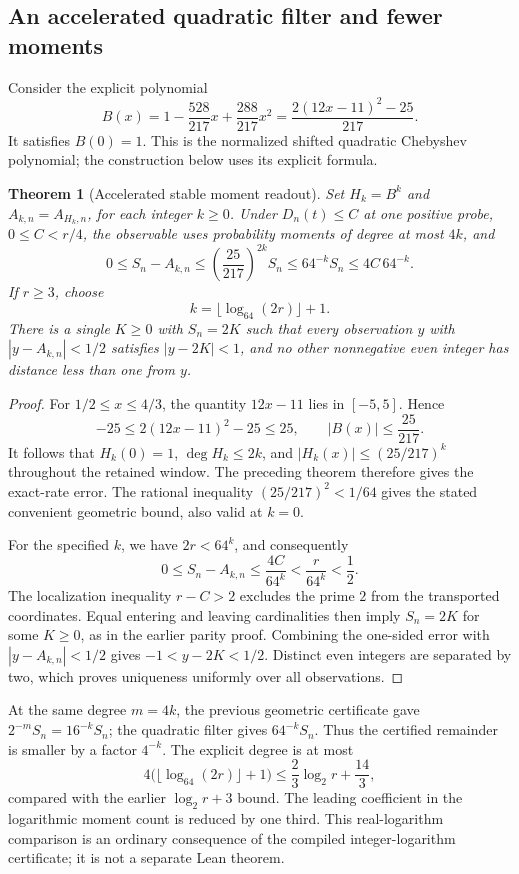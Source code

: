 \documentclass[11pt]{article}
\newtheorem{theorem}{Theorem}[section]
\theoremstyle{definition}
\begin{document}
\subsection{An accelerated quadratic filter and fewer moments}

Consider the explicit polynomial
\[
 B(x)=1-\frac{528}{217}x+\frac{288}{217}x^2
     =\frac{2(12x-11)^2-25}{217}.
\]
It satisfies $B(0)=1$. This is the normalized shifted quadratic
Chebyshev polynomial; the construction below uses its explicit formula.

\begin{theorem}[Accelerated stable moment readout]
Set $H_k=B^k$ and $A_{k,n}=A_{H_k,n}$, for each integer $k\ge0$.
Under $D_n(t)\le C$ at one positive probe, $0\le C<r/4$,
the observable uses probability moments of degree at most $4k$, and
\[
 0\le S_n-A_{k,n}
 \le\left(\frac{25}{217}\right)^{2k}S_n
 \le64^{-k}S_n\le4C\,64^{-k}.
\]
If $r\ge3$, choose
\[
 k=\lfloor\log_{64}(2r)\rfloor+1.
\]
There is a single $K\ge0$ with $S_n=2K$ such that every observation
$y$ with $|y-A_{k,n}|<1/2$ satisfies $|y-2K|<1$, and no other
nonnegative even integer has distance less than one from $y$.
\end{theorem}
\begin{proof}
For $1/2\le x\le4/3$, the quantity $12x-11$ lies in $[-5,5]$.
Hence
\[
 -25\le2(12x-11)^2-25\le25,\qquad
 |B(x)|\le\frac{25}{217}.
\]
It follows that $H_k(0)=1$, $\deg H_k\le2k$, and
$|H_k(x)|\le(25/217)^k$ throughout the retained window.
The preceding theorem therefore gives the exact-rate error.
The rational inequality $(25/217)^2<1/64$ gives the stated
convenient geometric bound, also valid at $k=0$.

For the specified $k$, we have $2r<64^k$, and consequently
\[
 0\le S_n-A_{k,n}\le\frac{4C}{64^k}
       <\frac r{64^k}<\frac12.
\]
The localization inequality $r-C>2$ excludes the prime $2$ from
the transported coordinates. Equal entering and leaving cardinalities
then imply $S_n=2K$ for some $K\ge0$, as in the earlier parity proof.
Combining the one-sided error with $|y-A_{k,n}|<1/2$ gives
$-1<y-2K<1/2$. Distinct even integers are separated by two,
which proves uniqueness uniformly over all observations.
\end{proof}

At the same degree $m=4k$, the previous geometric certificate gave
$2^{-m}S_n=16^{-k}S_n$; the quadratic filter gives $64^{-k}S_n$.
Thus the certified remainder is smaller by a factor $4^{-k}$.
The explicit degree is at most
\[
 4\bigl(\lfloor\log_{64}(2r)\rfloor+1\bigr)
 \le \frac23\log_2 r+\frac{14}{3},
\]
compared with the earlier $\log_2r+3$ bound. The leading coefficient
in the logarithmic moment count is reduced by one third.
This real-logarithm comparison is an ordinary consequence of the
compiled integer-logarithm certificate; it is not a separate Lean theorem.
\end{document}
